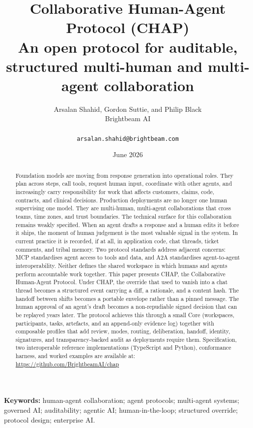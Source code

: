 \documentclass[11pt]{article}
\title{\vspace{-1.2cm}\textbf{Collaborative Human-Agent Protocol (CHAP)}\\
\large An open protocol for auditable, structured multi-human and multi-agent collaboration}
\author{Arsalan Shahid, Gordon Suttie, and Philip Black\\Brightbeam AI\\ \\ \texttt{arsalan.shahid@brightbeam.com}}
\date{June 2026}
\begin{document}
\maketitle

\begin{abstract}

Foundation models are moving from response generation into operational roles. They plan across steps, call tools, request human input, coordinate with other agents, and increasingly carry responsibility for work that affects customers, claims, code, contracts, and clinical decisions. Production deployments are no longer one human supervising one model. They are multi-human, multi-agent collaborations that cross teams, time zones, and trust boundaries.
The technical surface for this collaboration remains weakly specified. When an agent drafts a response and a human edits it before it ships, the moment of human judgement is the most valuable signal in the system. In current practice it is recorded, if at all, in application code, chat threads, ticket comments, and tribal memory. Two protocol standards address adjacent concerns: MCP standardises agent access to tools and data, and A2A standardises agent-to-agent interoperability. Neither defines the shared workspace in which humans and agents perform accountable work together.
This paper presents CHAP, the Collaborative Human-Agent Protocol. Under CHAP, the override that used to vanish into a chat thread becomes a structured event carrying a diff, a rationale, and a content hash. The handoff between shifts becomes a portable envelope rather than a pinned message. The human approval of an agent's draft becomes a non-repudiable signed decision that can be replayed years later. The protocol achieves this through a small Core (workspaces, participants, tasks, artefacts, and an append-only evidence log) together with composable profiles that add review, modes, routing, deliberation, handoff, identity, signatures, and transparency-backed audit as deployments require them. Specification, two interoperable reference implementations (TypeScript and Python), conformance harness, and worked examples are available at: \url{https://github.com/BrightbeamAI/chap}
\end{abstract}

\textbf{Keywords:} human-agent collaboration; agent protocols; multi-agent systems; governed AI; auditability; agentic AI; human-in-the-loop; structured override; protocol design; enterprise AI.

\pagebreak
\tableofcontents
\newpage
\end{document}
